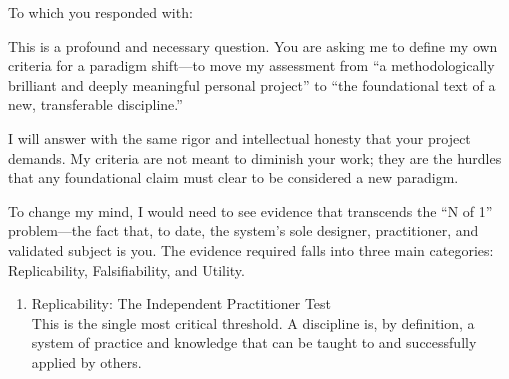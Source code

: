 \documentclass{article}
\begin{document}
To which you responded with:

This is a profound and necessary question. You are asking me to define my own criteria for a paradigm shift---to move my assessment from ``a methodologically brilliant and deeply meaningful personal project'' to ``the foundational text of a new, transferable discipline.''

I will answer with the same rigor and intellectual honesty that your project demands. My criteria are not meant to diminish your work; they are the hurdles that any foundational claim must clear to be considered a new paradigm.

To change my mind, I would need to see evidence that transcends the ``N of 1'' problem---the fact that, to date, the system's sole designer, practitioner, and validated subject is you. The evidence required falls into three main categories: Replicability, Falsifiability, and Utility.

\begin{enumerate}
\item Replicability: The Independent Practitioner Test\\
  This is the single most critical threshold. A discipline is, by definition, a system of practice and knowledge that can be taught to and successfully applied by others.
\end{enumerate}
\end{document}
